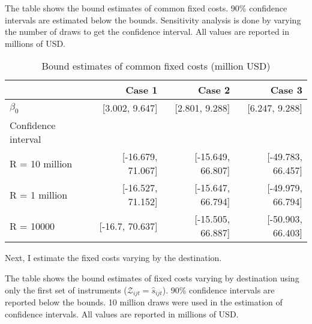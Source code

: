 \documentclass[11pt, letterpaper]{article} \usepackage{amsmath}
\newcommand{\floatintro}[1]{
  
  \vspace*{0.1in}
  
  {\footnotesize

    #1
    
  }
  
  \vspace*{0.1in} } \newcommand{\Hline}{\noindent\rule{18cm}{0.5pt}}
\begin{document}
\begin{table}[htbp!]
  \floatintro{The table shows the bound estimates of common fixed
    costs. 90\% confidence intervals are estimated below the
    bounds. Sensitivity analysis is done by varying the number of
    draws to get the confidence interval. All values are reported in
    millions of USD.}
  \centering
  \begin{tabular}{lrrr}
    \hline
    & Case 1 & Case 2 & Case 3 \\
    \hline
    $\beta_0$ & {[}3.002, 9.647{]} & {[}2.801, 9.288{]} & {[}6.247, 9.288{]} \\
    Confidence interval &  &  &  \\
    R = 10 million & {[}-16.679, 71.067{]} & {[}-15.649, 66.807{]} & {[}-49.783, 66.457{]} \\
    R = 1 million & {[}-16.527, 71.152{]} & {[}-15.647, 66.794{]} & {[}-49.979, 66.794{]} \\
    R = 10000 & {[}-16.7, 70.637{]} & {[}-15.505, 66.887{]} &
                                                              {[}-50.903, 66.403{]}\\
    \hline
  \end{tabular}
  \caption{Bound estimates of common fixed costs (million USD)}
  \label{tab:res1}
\end{table}
Next, I estimate the fixed costs varying by the destination.
\begin{table}[htbp!]
  \floatintro{The table shows the bound estimates of fixed costs
    varying by destination using only the first set of instruments
    ($\mathcal{Z}_{ijt} = \hat s_{ijt}$). 90\% confidence intervals are reported
    below the bounds. 10 million draws were used in the estimation of
    confidence intervals. All values are
    reported in millions of USD.}
  \centering
  \caption{Bound estimates of fixed costs varying by destination
    (million USD)}
  \label{tab:res2}
\end{table}
\end{document}
